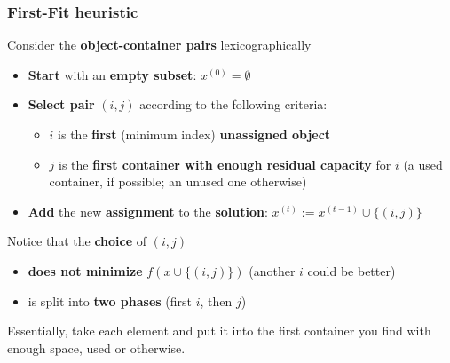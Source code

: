 \documentclass[11pt]{article}
\begin{document}
	\subsubsection{First-Fit heuristic}
	Consider the \textbf{object-container pairs} lexicographically
	\begin{itemize}
		\item \textbf{Start} with an \textbf{empty subset}: $x^{(0)} = \emptyset$
		\item \textbf{Select pair} $(i, j)$ according to the following criteria:
		\begin{itemize}
			\item $i$ is the \textbf{first} (minimum index) \textbf{unassigned object}
			\item $j$ is the \textbf{first container with enough residual capacity} for $i$ (a used container, if possible; an unused one otherwise)
		\end{itemize}
		\item \textbf{Add} the new \textbf{assignment} to the \textbf{solution}: $x^{(t)} := x^{(t−1)} \cup \{(i, j)\}$
	\end{itemize}
	
	Notice that the \textbf{choice} of $(i, j)$
	\begin{itemize}
		\item \textbf{does not minimize} $f (x \cup \{(i, j)\})$ (another $i$ could be better)
		\item is split into \textbf{two phases} (first $i$, then $j$)
	\end{itemize}
	
	Essentially, take each element and put it into the first container you find with enough space, used or otherwise.\\
	
	\newpage
	
\end{document}
